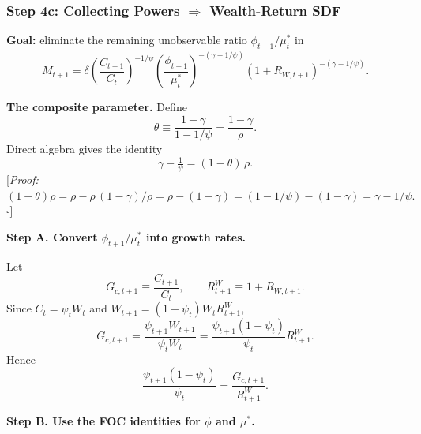 \documentclass{beamer}
\begin{document}
\begin{frame}[allowframebreaks]
    \frametitle{Step 4c: Collecting Powers $\Rightarrow$ Wealth-Return SDF}

    \textbf{Goal:} eliminate the remaining unobservable ratio $\phi_{t+1}/\mu_t^*$ in
    \begin{equation*}
        M_{t+1}
        = \delta\left(\frac{C_{t+1}}{C_t}\right)^{-1/\psi}
        \left(\frac{\phi_{t+1}}{\mu_t^*}\right)^{-(\gamma-1/\psi)}
        (1+R_{W,t+1})^{-(\gamma-1/\psi)}.
    \end{equation*}

    \textbf{The composite parameter.} Define
    \begin{equation*}
    	\theta \equiv \frac{1-\gamma}{1-1/\psi} = \frac{1-\gamma}{\rho}.
    \end{equation*}
    Direct algebra gives the identity
    \begin{equation}\label{eq:theta-identity}
    	\gamma - \tfrac{1}{\psi} = (1-\theta)\,\rho.
    \end{equation}
    [\textit{Proof:} $(1-\theta)\rho = \rho - \rho\,(1-\gamma)/\rho = \rho - (1-\gamma) = (1-1/\psi) - (1-\gamma) = \gamma - 1/\psi.$ \quad $\square$]

    \framebreak

    \textbf{Step A. Convert $\phi_{t+1}/\mu_t^*$ into growth rates.}

    Let
    \begin{equation*}
        G_{c,t+1}\equiv \frac{C_{t+1}}{C_t}, \qquad R^W_{t+1}\equiv 1+R_{W,t+1}.
    \end{equation*}
    Since $C_t=\psi_tW_t$ and $W_{t+1}=(1-\psi_t)W_tR^W_{t+1}$,
    \begin{equation*}
        G_{c,t+1}
        =\frac{\psi_{t+1}W_{t+1}}{\psi_tW_t}
        =\frac{\psi_{t+1}(1-\psi_t)}{\psi_t}R^W_{t+1}.
    \end{equation*}
    Hence
    \begin{equation}\label{eq:gc-rw-psi-ratio}
        \frac{\psi_{t+1}(1-\psi_t)}{\psi_t}
        =\frac{G_{c,t+1}}{R^W_{t+1}}.
    \end{equation}

    \framebreak

    \textbf{Step B. Use the FOC identities for $\phi$ and $\mu^*$.}


\end{frame}
\end{document}
